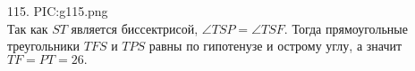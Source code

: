 115. {{PIC:g115.png}}\\
Так как $ST$ является биссектрисой, $\angle TSP=\angle TSF.$ Тогда прямоугольные треугольники $TFS$ и $TPS$ равны по гипотенузе и острому углу, а значит $TF=PT=26.$\\
